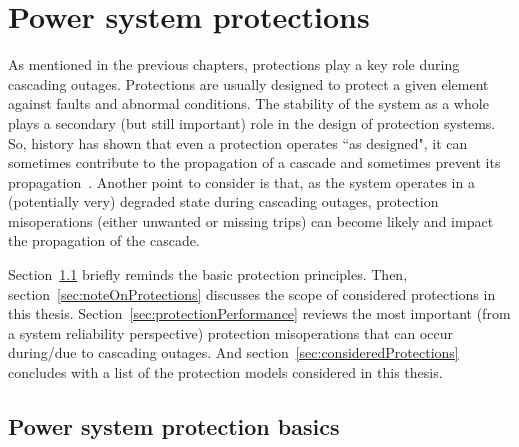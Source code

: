 \chapter{Power system protections}
\label{ch:protections}

\cite{ProtectionMisoperationsBian2012}

As mentioned in the previous chapters, protections play a key role during cascading outages. Protections are usually designed to protect a given element against faults and abnormal conditions. The stability of the system as a whole plays a secondary (but still important) role in the design of protection systems. So, history has shown that even a protection operates ``as designed", it can sometimes contribute to the propagation of a cascade and sometimes prevent its propagation~\cite{PSRCreportProtectionMisop}. Another point to consider is that, as the system operates in a (potentially very) degraded state during cascading outages, protection misoperations (either unwanted or missing trips) can become likely and impact the propagation of the cascade.

Section~\ref{sec:protectionBasics} briefly reminds the basic protection principles. Then, section~\ref{sec:noteOnProtections} discusses the scope of considered protections in this thesis. Section~\ref{sec:protectionPerformance} reviews the most important (from a system reliability perspective) protection misoperations that can occur during/due to cascading outages. And section~\ref{sec:consideredProtections} concludes with a list of the protection models considered in this thesis.


\section{Power system protection basics}
\label{sec:protectionBasics}



